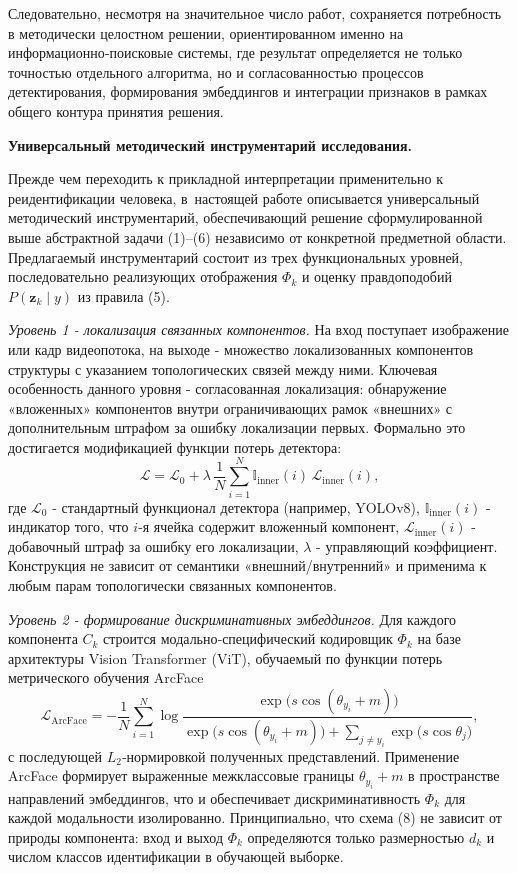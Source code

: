 Следовательно, несмотря на значительное число работ, сохраняется потребность
в методически целостном решении, ориентированном именно на информационно‑поисковые
системы, где результат определяется не только точностью отдельного алгоритма,
но и согласованностью процессов детектирования, формирования эмбеддингов и
интеграции признаков в рамках общего контура принятия решения.

\textbf{Универсальный методический инструментарий исследования.}

Прежде чем переходить к прикладной интерпретации применительно к
реидентификации человека, в~настоящей работе описывается универсальный методический
инструментарий, обеспечивающий решение сформулированной выше абстрактной
задачи (1)--(6) независимо от конкретной предметной области.
Предлагаемый инструментарий состоит из трех функциональных уровней, последовательно реализующих отображения
$\Phi_k$ и оценку правдоподобий $P(\mathbf{z}_k\mid y)$ из правила (5).

\emph{Уровень 1 - локализация связанных компонентов.} На вход поступает
изображение или кадр видеопотока, на выходе - множество локализованных
компонентов структуры с указанием топологических связей между ними.
Ключевая особенность данного уровня - согласованная локализация:
обнаружение «вложенных» компонентов внутри ограничивающих рамок
«внешних» с дополнительным штрафом за ошибку локализации первых.
Формально это достигается модификацией функции потерь детектора:
\begin{equation}
    \mathcal{L}=\mathcal{L}_0+\lambda\,\frac{1}{N}\sum_{i=1}^{N}\mathbb{I}_{\text{inner}}(i)\,\mathcal{L}_{\text{inner}}(i),
\end{equation}
где $\mathcal{L}_0$ - стандартный функционал детектора (например, YOLOv8),
$\mathbb{I}_{\text{inner}}(i)$ - индикатор того, что $i$‑я ячейка содержит
вложенный компонент, $\mathcal{L}_{\text{inner}}(i)$ - добавочный штраф за
ошибку его локализации, $\lambda$ - управляющий коэффициент. Конструкция
не зависит от семантики «внешний/внутренний» и применима к любым парам
топологически связанных компонентов.

\emph{Уровень 2 - формирование дискриминативных эмбеддингов.}
Для каждого компонента $C_k$ строится модально‑специфический кодировщик
$\Phi_k$ на базе архитектуры Vision Transformer (ViT), обучаемый по
функции потерь метрического обучения ArcFace
\begin{equation}
    \mathcal{L}_{\text{ArcFace}}=-\frac{1}{N}\sum_{i=1}^{N}\log\frac{\exp\!\bigl(s\cos(\theta_{y_i}+m)\bigr)}{\exp\!\bigl(s\cos(\theta_{y_i}+m)\bigr)+\sum_{j\neq y_i}\exp\!\bigl(s\cos\theta_j\bigr)},
\end{equation}
с последующей $L_2$‑нормировкой полученных представлений. Применение
ArcFace формирует выраженные межклассовые границы
$\theta_{y_i}+m$ в пространстве направлений эмбеддингов, что и обеспечивает
дискриминативность $\Phi_k$ для каждой модальности изолированно.
Принципиально, что схема (8) не зависит от природы компонента: вход и
выход $\Phi_k$ определяются только размерностью $d_k$ и числом
классов идентификации в обучающей выборке.

